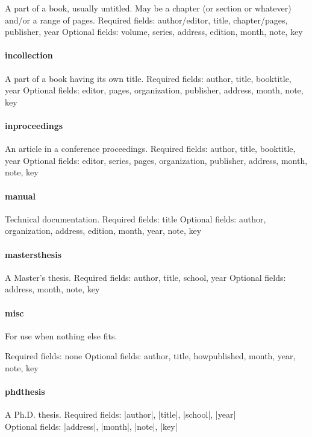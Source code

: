 \begin{refsection}
    A part of a book, usually untitled. May be a chapter (or section or whatever) and/or a range of pages.
    Required fields: author/editor, title, chapter/pages, publisher, year
    Optional fields: volume, series, address, edition, month, note, key

\paragraph{incollection}

    A part of a book having its own title.
    Required fields: author, title, booktitle, year
    Optional fields: editor, pages, organization, publisher, address, month, note, key

\paragraph{inproceedings}

An article in a conference proceedings.
Required fields: author, title, booktitle, year
Optional fields: editor, series, pages, organization, publisher, address, month, note, key



\paragraph{manual}

Technical documentation.
Required fields: title
Optional fields: author, organization, address, edition, month, year, note, key

\paragraph{mastersthesis}

A Master's thesis.
Required fields: author, title, school, year
Optional fields: address, month, note, key

\paragraph{misc}

For use when nothing else fits.

Required fields: none
Optional fields: author, title, howpublished, month, year, note, key

\paragraph{phdthesis} A Ph.D. thesis.
Required fields: |author|, |title|, |school|, |year|\\
Optional fields: |address|, |month|, |note|, |key|


\end{refsection}
